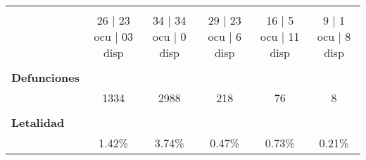 \begin{tabular}{l|ccccc|}
	\multicolumn{1}{c|}{\cellcolor[HTML]{E2EFDA}} &
	\cellcolor[HTML]{FFF2CC} \\ \cline{1-1}
	&
	\multicolumn{1}{c|}{\multirow{-3}{*}{\cellcolor[HTML]{FCE4D6}26 | 23 ocu |   03 disp}} &
	\multicolumn{1}{c|}{\multirow{-3}{*}{\cellcolor[HTML]{EDEDED}34 | 34 ocu | 0 disp}} &
	\multicolumn{1}{c|}{\multirow{-3}{*}{\cellcolor[HTML]{DDEBF7}29 | 23 ocu | 6 disp}} &
	\multicolumn{1}{c|}{\multirow{-3}{*}{\cellcolor[HTML]{E2EFDA}16 | 5 ocu | 11 disp}} &
	\multirow{-3}{*}{\cellcolor[HTML]{FFF2CC}9 | 1 ocu | 8 disp} \\ \cline{2-6} 
	\textbf{} &
	\multicolumn{1}{c|}{\cellcolor[HTML]{FCE4D6}} &
	\multicolumn{1}{c|}{\cellcolor[HTML]{EDEDED}} &
	\multicolumn{1}{c|}{\cellcolor[HTML]{DDEBF7}} &
	\multicolumn{1}{c|}{\cellcolor[HTML]{E2EFDA}} &
	\cellcolor[HTML]{FFF2CC} \\ \cline{1-1}
	\multicolumn{1}{|l|}{\textbf{Defunciones}} &
	\multicolumn{1}{c|}{\cellcolor[HTML]{FCE4D6}} &
	\multicolumn{1}{c|}{\cellcolor[HTML]{EDEDED}} &
	\multicolumn{1}{c|}{\cellcolor[HTML]{DDEBF7}} &
	\multicolumn{1}{c|}{\cellcolor[HTML]{E2EFDA}} &
	\cellcolor[HTML]{FFF2CC} \\ \cline{1-1}
	&
	\multicolumn{1}{c|}{\multirow{-3}{*}{\cellcolor[HTML]{FCE4D6}1334}} &
	\multicolumn{1}{c|}{\multirow{-3}{*}{\cellcolor[HTML]{EDEDED}2988}} &
	\multicolumn{1}{c|}{\multirow{-3}{*}{\cellcolor[HTML]{DDEBF7}218}} &
	\multicolumn{1}{c|}{\multirow{-3}{*}{\cellcolor[HTML]{E2EFDA}76}} &
	\multirow{-3}{*}{\cellcolor[HTML]{FFF2CC}8} \\ \cline{2-6} 
	\textbf{} &
	\multicolumn{1}{c|}{\cellcolor[HTML]{FCE4D6}} &
	\multicolumn{1}{c|}{\cellcolor[HTML]{EDEDED}} &
	\multicolumn{1}{c|}{\cellcolor[HTML]{DDEBF7}} &
	\multicolumn{1}{c|}{\cellcolor[HTML]{E2EFDA}} &
	\cellcolor[HTML]{FFF2CC} \\ \cline{1-1}
	\multicolumn{1}{|l|}{\textbf{Letalidad}} &
	\multicolumn{1}{c|}{\cellcolor[HTML]{FCE4D6}} &
	\multicolumn{1}{c|}{\cellcolor[HTML]{EDEDED}} &
	\multicolumn{1}{c|}{\cellcolor[HTML]{DDEBF7}} &
	\multicolumn{1}{c|}{\cellcolor[HTML]{E2EFDA}} &
	\cellcolor[HTML]{FFF2CC} \\ \cline{1-1}
	&
	\multicolumn{1}{c|}{\multirow{-3}{*}{\cellcolor[HTML]{FCE4D6}1.42\%}} &
	\multicolumn{1}{c|}{\multirow{-3}{*}{\cellcolor[HTML]{EDEDED}3.74\%}} &
	\multicolumn{1}{c|}{\multirow{-3}{*}{\cellcolor[HTML]{DDEBF7}0.47\%}} &
	\multicolumn{1}{c|}{\multirow{-3}{*}{\cellcolor[HTML]{E2EFDA}0.73\%}} &
	\multirow{-3}{*}{\cellcolor[HTML]{FFF2CC}0.21\%} \\ \cline{2-6} 

\end{tabular}
